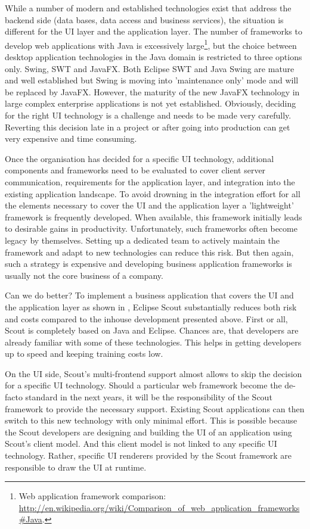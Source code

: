 \documentclass[a4paper,10pt,twoside]{book}
\begin{document}
While a number of modern and established technologies exist that address the backend side (data bases, data access and business services), the situation is different for the UI layer and the application layer. 
The number of frameworks to develop web applications with Java is excessively large\footnote{
Web application framework comparison: \url{http://en.wikipedia.org/wiki/Comparison_of_web_application_frameworks#Java}.
},
but the choice between desktop application technologies in the Java domain is restricted to three options only. 
Swing, SWT and JavaFX.
Both Eclipse SWT and Java Swing are mature and well established but Swing is moving into 'maintenance only' mode and will be replaced by JavaFX.
However, the maturity of the new JavaFX technology in large complex enterprise applications is not yet established. 
Obviously, deciding for the right UI technology is a challenge and needs to be made very carefully. 
Reverting this decision late in a project or after going into production can get very expensive and time consuming. 

Once the organisation has decided for a specific UI technology, additional components and frameworks need to be evaluated to cover client server communication, requirements for the application layer, and integration into the existing application landscape. 
To avoid drowning in the integration effort for all the elements necessary to cover the UI and the application layer a 'lightweight' framework is frequently developed. 
When available, this framework initially leads to desirable gains in productivity. 
Unfortunately, such frameworks often become legacy by themselves. 
Setting up a dedicated team to actively maintain the framework and adapt to new technologies can reduce this risk. 
But then again, such a strategy is expensive and developing business application frameworks is usually not the core business of a company. 

Can we do better? 
To implement a business application that covers the UI and the application layer as shown in , Eclipse Scout substantially reduces both risk and costs compared to the inhouse development presented above.
First or all, Scout is completely based on Java and Eclipse. 
Chances are, that developers are already familiar with some of these technologies.
This helps in getting developers up to speed and keeping training costs low. 

On the UI side, Scout's multi-frontend support almost allows to skip the decision for a specific UI technology. 
Should a particular web framework become the de-facto standard in the next years, it will be the responsibility of the Scout framework to provide the necessary support. 
Existing Scout applications can then switch to this new technology with only minimal effort. 
This is possible because the Scout developers are designing and building the UI of an application using Scout's client model.
And this client model is not linked to any specific UI technology. 
Rather, specific UI renderers provided by the Scout framework are responsible to draw the UI at runtime. 
\end{document}
